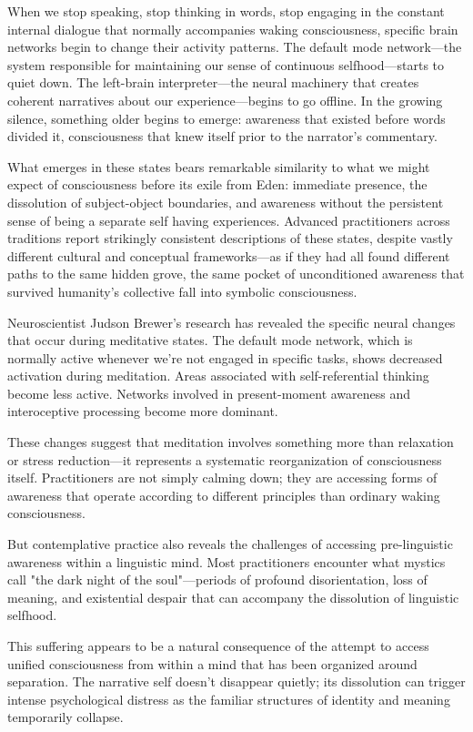 When we stop speaking, stop thinking in words, stop engaging in the constant internal dialogue that normally accompanies waking consciousness, specific brain networks begin to change their activity patterns. The default mode network—the system responsible for maintaining our sense of continuous selfhood—starts to quiet down. The left-brain interpreter—the neural machinery that creates coherent narratives about our experience—begins to go offline. In the growing silence, something older begins to emerge: awareness that existed before words divided it, consciousness that knew itself prior to the narrator's commentary.

What emerges in these states bears remarkable similarity to what we might expect of consciousness before its exile from Eden: immediate presence, the dissolution of subject-object boundaries, and awareness without the persistent sense of being a separate self having experiences. Advanced practitioners across traditions report strikingly consistent descriptions of these states, despite vastly different cultural and conceptual frameworks—as if they had all found different paths to the same hidden grove, the same pocket of unconditioned awareness that survived humanity's collective fall into symbolic consciousness.

Neuroscientist Judson Brewer's research has revealed the specific neural changes that occur during meditative states. The default mode network, which is normally active whenever we're not engaged in specific tasks, shows decreased activation during meditation. Areas associated with self-referential thinking become less active. Networks involved in present-moment awareness and interoceptive processing become more dominant.

These changes suggest that meditation involves something more than relaxation or stress reduction—it represents a systematic reorganization of consciousness itself. Practitioners are not simply calming down; they are accessing forms of awareness that operate according to different principles than ordinary waking consciousness.

But contemplative practice also reveals the challenges of accessing pre-linguistic awareness within a linguistic mind. Most practitioners encounter what mystics call "the dark night of the soul"—periods of profound disorientation, loss of meaning, and existential despair that can accompany the dissolution of linguistic selfhood.

This suffering appears to be a natural consequence of the attempt to access unified consciousness from within a mind that has been organized around separation. The narrative self doesn't disappear quietly; its dissolution can trigger intense psychological distress as the familiar structures of identity and meaning temporarily collapse.

